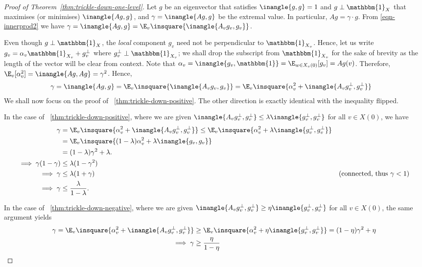 \documentclass{toc}
\begin{document}
\begin{proof}[Proof of Theorem~\ref{thm:trickle-down-one-level}]
  Let $g$ be an eigenvector that satisfies $\inangle{g,g} = 1$ and
  $g\perp \mathbbm{1}_X$ that maximises (or minimises) $\inangle{Ag,g}$, and $\gamma =
  \inangle{Ag,g}$ be the extremal value. In particular, $Ag =
  \gamma\cdot g$. From \eqref{eqn-innerprod2} we have
    $\gamma = \inangle{Ag,g} = \E_v \insquare{\inangle{A_v g_v,g_v}}$.

    Even though $g \perp \mathbbm{1}_X$, the \emph{local} component $g_v$ need not be perpendicular to $\mathbbm{1}_{X_v}$. Hence,  let us write $g_v = \alpha_v \mathbbm{1}_{X_v} + g_v^{\perp}$ where $g_v^{\perp} \perp \mathbbm{1}_{X_v}$; we shall drop the subscript from $\mathbbm{1}_{X_v}$ for the sake of brevity as the length of the vector will be clear from context. Note that $\alpha_v = \inangle{g_v, \mathbbm{1}} = \E_{w\in X_v(0)} [g_v] = Ag(v)$. Therefore, $\E_v [\alpha_v^2] = \inangle{Ag,Ag} = \gamma^2$. Hence,
  \begin{align}
    \gamma = \inangle{Ag,g} & = \E_v \insquare{\inangle{A_v g_v,g_v}} = \E_v \insquare{\alpha_v^2 + \inangle{A_v g_v^\perp, g_v^{\perp}}}\label{eqn:trickle-LHS}
  \end{align}
  We shall now focus on the proof of ~\eqref{thm:trickle-down-positive}. The other direction is exactly identical with the inequality flipped.

  In the case of ~\eqref{thm:trickle-down-positive}, where we are given $\inangle{A_v g_v^\perp, g_v^{\perp}} \leq \lambda \inangle{g_v^\perp, g_v^{\perp}}$ for all $v\in X(0)$, we have
  \begin{align*}
    \gamma &= \E_v \insquare{\alpha_v^2 + \inangle{A_v g_v^\perp, g_v^{\perp}}} \leq \E_v \insquare{\alpha_v^2 + \lambda \inangle{g_v^\perp, g_v^{\perp}}} \\
    & = \E_v \insquare{(1-\lambda) \alpha_v^2 + \lambda \inangle{g_v, g_v}}\\
    &= (1-\lambda) \gamma^2 + \lambda.\\
    \implies \gamma(1-\gamma) & \leq \lambda (1- \gamma^2)\\
    \implies \gamma & \leq \lambda (1+\gamma) &\text{(connected, thus $\gamma < 1$)}\\
    \implies \gamma & \leq \frac{\lambda}{1 - \lambda}.
  \end{align*}

  In the case of ~\eqref{thm:trickle-down-negative}, where we are given $\inangle{A_v g_v^\perp, g_v^{\perp}} \geq \eta \inangle{g_v^\perp, g_v^{\perp}}$ for all $v\in X(0)$, the same argument yields
  \begin{align*}
    \gamma = \E_v \insquare{\alpha_v^2 + \inangle{A_v g_v^\perp, g_v^{\perp}}}&\geq \E_v \insquare{\alpha_v^2 + \eta \inangle{g_v^\perp, g_v^{\perp}}} = (1 - \eta)\gamma^2 + \eta\\
    \implies \gamma & \geq \frac{\eta}{1 - \eta}\qedhere
  \end{align*}
\end{proof}
\end{document}
